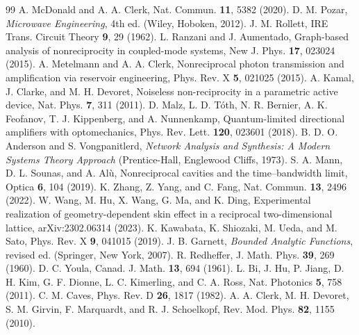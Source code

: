 \documentclass[aps,pra,twocolumn,superscriptaddress,floatfix,nofootinbib]{revtex4-2}
\theoremstyle{definition}
\begin{document}
\begin{thebibliography}{99}
 A. McDonald and A. A. Clerk, Nat. Commun. \textbf{11}, 5382 (2020).
 D. M. Pozar, \emph{Microwave Engineering}, 4th ed. (Wiley, Hoboken, 2012).
 J. M. Rollett, IRE Trans. Circuit Theory \textbf{9}, 29 (1962).
 L. Ranzani and J. Aumentado, Graph-based analysis of nonreciprocity in coupled-mode systems, New J. Phys. \textbf{17}, 023024 (2015).
 A. Metelmann and A. A. Clerk, Nonreciprocal photon transmission and amplification via reservoir engineering, Phys. Rev. X \textbf{5}, 021025 (2015).
 A. Kamal, J. Clarke, and M. H. Devoret, Noiseless non-reciprocity in a parametric active device, Nat. Phys. \textbf{7}, 311 (2011).
 D. Malz, L. D. T\'oth, N. R. Bernier, A. K. Feofanov, T. J. Kippenberg, and A. Nunnenkamp, Quantum-limited directional amplifiers with optomechanics, Phys. Rev. Lett. \textbf{120}, 023601 (2018).
 B. D. O. Anderson and S. Vongpanitlerd, \emph{Network Analysis and Synthesis: A Modern Systems Theory Approach} (Prentice-Hall, Englewood Cliffs, 1973).
 S. A. Mann, D. L. Sounas, and A. Al\`u, Nonreciprocal cavities and the time--bandwidth limit, Optica \textbf{6}, 104 (2019).
 K. Zhang, Z. Yang, and C. Fang, Nat. Commun. \textbf{13}, 2496 (2022).
 W. Wang, M. Hu, X. Wang, G. Ma, and K. Ding, Experimental realization of geometry-dependent skin effect in a reciprocal two-dimensional lattice, arXiv:2302.06314 (2023).
 K. Kawabata, K. Shiozaki, M. Ueda, and M. Sato, Phys. Rev. X \textbf{9}, 041015 (2019).
 J. B. Garnett, \emph{Bounded Analytic Functions}, revised ed. (Springer, New York, 2007).
 R. Redheffer, J. Math. Phys. \textbf{39}, 269 (1960).
 D. C. Youla, Canad. J. Math. \textbf{13}, 694 (1961).
 L. Bi, J. Hu, P. Jiang, D. H. Kim, G. F. Dionne, L. C. Kimerling, and C. A. Ross, Nat. Photonics \textbf{5}, 758 (2011).
 C. M. Caves, Phys. Rev. D \textbf{26}, 1817 (1982).
 A. A. Clerk, M. H. Devoret, S. M. Girvin, F. Marquardt, and R. J. Schoelkopf, Rev. Mod. Phys. \textbf{82}, 1155 (2010).
\end{thebibliography}
\end{document}
